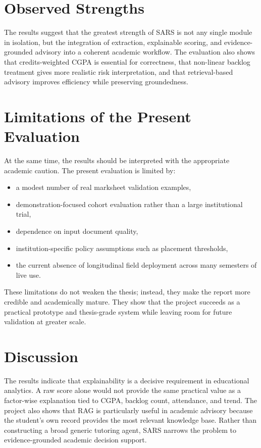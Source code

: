 \section{Observed Strengths}
The results suggest that the greatest strength of SARS is not any single module in isolation, but the integration of extraction, explainable scoring, and evidence-grounded advisory into a coherent academic workflow. The evaluation also shows that credits-weighted CGPA is essential for correctness, that non-linear backlog treatment gives more realistic risk interpretation, and that retrieval-based advisory improves efficiency while preserving groundedness.

\section{Limitations of the Present Evaluation}
At the same time, the results should be interpreted with the appropriate academic caution. The present evaluation is limited by:
\begin{itemize}[leftmargin=*]
\item a modest number of real marksheet validation examples,
\item demonstration-focused cohort evaluation rather than a large institutional trial,
\item dependence on input document quality,
\item institution-specific policy assumptions such as placement thresholds,
\item the current absence of longitudinal field deployment across many semesters of live use.
\end{itemize}

These limitations do not weaken the thesis; instead, they make the report more credible and academically mature. They show that the project succeeds as a practical prototype and thesis-grade system while leaving room for future validation at greater scale.

\section{Discussion}
The results indicate that explainability is a decisive requirement in educational analytics. A raw score alone would not provide the same practical value as a factor-wise explanation tied to CGPA, backlog count, attendance, and trend. The project also shows that RAG is particularly useful in academic advisory because the student's own record provides the most relevant knowledge base. Rather than constructing a broad generic tutoring agent, SARS narrows the problem to evidence-grounded academic decision support.

